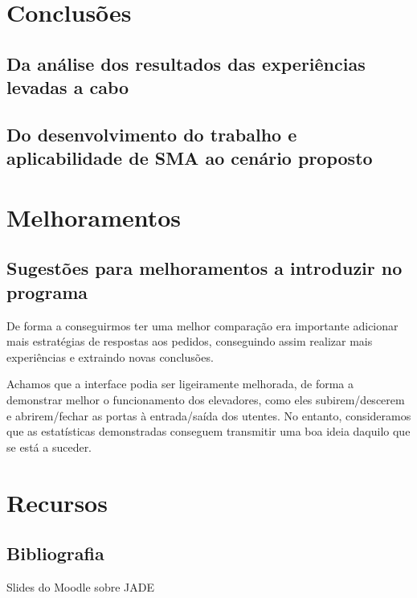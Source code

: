 \documentclass[a4paper]{article}
\begin{document}
\newpage

\section{Conclusões}

\subsection{Da análise dos resultados das experiências levadas a cabo} 

\subsection{Do desenvolvimento do trabalho e aplicabilidade de SMA ao cenário proposto}

\newpage

\section{Melhoramentos}

\subsection{Sugestões para melhoramentos a introduzir no programa}

De forma a conseguirmos ter uma melhor comparação era importante adicionar mais estratégias de respostas aos pedidos, conseguindo assim realizar mais experiências e extraindo novas conclusões.

Achamos que a interface podia ser ligeiramente melhorada, de forma a demonstrar melhor o funcionamento dos elevadores, como eles subirem/descerem e abrirem/fechar as portas à entrada/saída dos utentes. No entanto, consideramos que as estatísticas demonstradas conseguem transmitir uma boa ideia daquilo que se está a suceder.

\newpage


\section{Recursos}

\subsection{Bibliografia} 

Slides do Moodle sobre JADE
\end{document}
